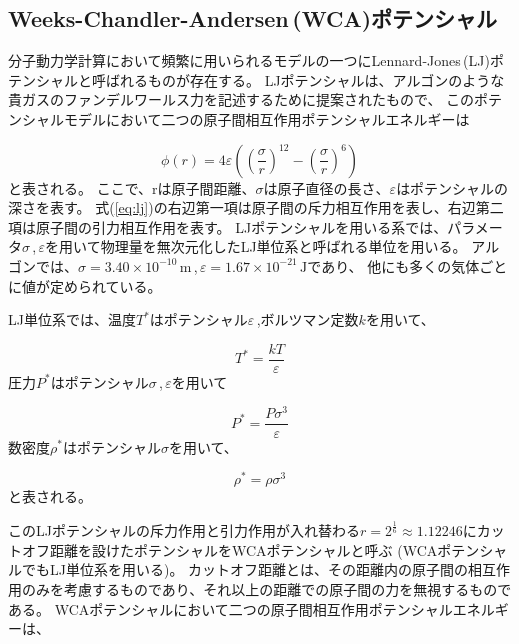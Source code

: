 \documentclass[titlepage]{jsreport}
\begin{document}
\subsection{Weeks-Chandler-Andersen\,(WCA)ポテンシャル}\label{method-subsec:WCA}
分子動力学計算において頻繁に用いられるモデルの一つにLennard-Jones\,(LJ)ポテンシャルと呼ばれるものが存在する。
LJポテンシャルは、アルゴンのような貴ガスのファンデルワールス力を記述するために提案\cite{Lennard_Jones_1931}されたもので、
このポテンシャルモデルにおいて二つの原子間相互作用ポテンシャルエネルギーは

\large
\begin{equation}
\phi(r)=4{\varepsilon}\left(\left(\frac{\sigma}{r}\right)^{12}-\left(\frac{\sigma}{r}\right)^6\right)\label{eq:lj}
\end{equation}
\normalsize
と表される。
ここで、rは原子間距離、${\sigma}$は原子直径の長さ、${\varepsilon}$はポテンシャルの深さを表す。
式(\ref{eq:lj})の右辺第一項は原子間の斥力相互作用を表し、右辺第二項は原子間の引力相互作用を表す。
LJポテンシャルを用いる系では、パラメータ$\sigma$\,,\,$\varepsilon$を用いて物理量を無次元化したLJ単位系と呼ばれる単位を用いる。
アルゴンでは、${\sigma}=3.40×10^{-10}\,\mathrm{m}$\,,\,${\varepsilon}=1.67×10^{-21}\,\mathrm{J}$であり\cite{argon-parameters}、
他にも多くの気体ごとに値が定められている\cite{graphane-parameters,many-parameters}。

LJ単位系では、温度$T^*$はポテンシャル$\varepsilon$\,,ボルツマン定数$k$を用いて、

\large
\begin{equation}
T^*=\frac{kT}{\varepsilon}\label{eq:T}
\end{equation}
\normalsize
圧力$P^*$はポテンシャル${\sigma}$\,,\,${\varepsilon}$を用いて

\large
\begin{equation}
P^*=\frac{P\sigma^3}{\varepsilon}\label{eq:P}
\end{equation}
\normalsize
数密度$\rho^*$はポテンシャル$\sigma$を用いて、

\large
\begin{equation}
\rho^*=\rho{\sigma}^3\label{eq:rho}
\end{equation}
\normalsize
と表される。

このLJポテンシャルの斥力作用と引力作用が入れ替わる$r=2^{\frac{1}{6}}{\approx}1.12246$にカットオフ距離を設けたポテンシャルをWCAポテンシャルと呼ぶ
(WCAポテンシャルでもLJ単位系を用いる)。
カットオフ距離とは、その距離内の原子間の相互作用のみを考慮するものであり、それ以上の距離での原子間の力を無視するものである\cite{WATANABE20191}。
WCAポテンシャルにおいて二つの原子間相互作用ポテンシャルエネルギーは、
\end{document}
